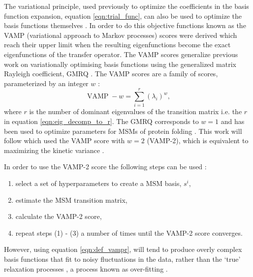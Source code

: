 The variational principle, used previously to optimize the coefficients in the basis function expansion, equation \ref{eqn:trial_func}, can also be used to optimize the basis functions themselves \cite{schererVariationalSelectionFeatures2019,husicOptimizedParameterSelection2016}. In order to do this objective functions known as the VAMP (variational approach to Markov processes) scores \cite{wuVariationalApproachLearning2020c} were derived which reach their upper limit when the resulting eigenfunctions become the exact eigenfunctions of the transfer operator. The VAMP scores generalize previous work on variationally optimising basis functions using the generalized matrix Rayleigh coefficient, GMRQ \cite{mcgibbonVariationalCrossvalidationSlow2015}. The VAMP scores are a family of scores, parameterized by an integer $w$ \cite{wuVariationalApproachLearning2020c}:
\begin{equation}\label{eqn:def_vampr}
\operatorname{VAMP}-w=\sum_{i=1}^{r}\left(\lambda_{i}\right)^{w}, 
\end{equation} 
where $r$ is the number of dominant eigenvalues of the transition matrix i.e. the $r$ in equation \ref{eqn:eig_decomp_to_r}. The GMRQ corresponds to $w=1$ and has been used to optimize parameters for MSMs of protein folding \cite{husicOptimizedParameterSelection2016}. This work will follow \cite{schererVariationalSelectionFeatures2019} which used the VAMP score with $w=2$ (VAMP-2), which is equivalent to maximizing the kinetic variance \cite{wuVariationalApproachLearning2020c}. 

In order to use the VAMP-2 score the following steps can be used  \cite{schererVariationalSelectionFeatures2019}:
\begin{enumerate}
    \item select a set of hyperparameters to create a MSM basis, $s^{i}$, 
    \item estimate the MSM transition matrix, 
    \item calculate the VAMP-2 score, 
    \item repeat steps (1) - (3) a number of times until the VAMP-2 score converges.
\end{enumerate}
However, using equation \ref{eqn:def_vampr}, will tend to produce overly complex basis functions that fit to noisy fluctuations in the data, rather than the `true' relaxation processes \cite{mcgibbonVariationalCrossvalidationSlow2015,wuVariationalApproachLearning2020c,schererVariationalSelectionFeatures2019}, a process known as over-fitting \cite{friedman2001elements}.

